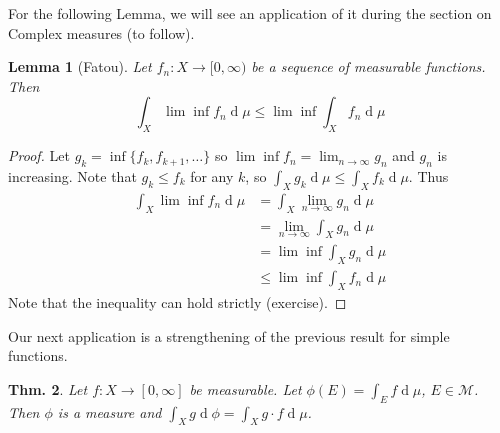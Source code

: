 \documentclass[12pt, a4paper]{book}
\renewcommand{\d}[1]{\ensuremath{\operatorname{d}\!{#1}}} %
\newtheorem{theorem}{Thm.}[section]
\newtheorem{lemma}[theorem]{Lemma}
\theoremstyle{nonumberplain}
\newtheorem{proof}{Proof}
\begin{document}
For the following Lemma, we will see an application of it during the section on Complex measures (to follow).
\begin{lemma}[Fatou]
    Let $f_n:X\to[0,\infty)$ be a sequence of measurable functions.
    Then
    \[\int_X\lim\inf f_n\d{\mu}\leq\lim\inf\int_X f_n\d{\mu}\]
\end{lemma}
\begin{proof}
    Let $g_k=\inf\{f_k,f_{k+1},\ldots\}$ so $\lim\inf f_n=\lim_{n\to\infty} g_n$ and $g_n$ is increasing.
    Note that $g_k\leq f_k$ for any $k$, so $\int_X g_k\d{\mu}\leq\int_X f_k\d{\mu}$.
    Thus
    \begin{align*}
        \int_X\lim\inf f_n\d{\mu} &= \int_X\lim_{n\to\infty}g_n\d{\mu}\\
                                  &= \lim_{n\to\infty}\int_X g_n\d{\mu}\\
                                  &= \lim\inf \int_X g_n\d{\mu}\\
                                  &\leq \lim\inf\int_X f_n\d{\mu}
    \end{align*}
    Note that the inequality can hold strictly (exercise).
\end{proof}
Our next application is a strengthening of the previous result for simple functions.
\begin{theorem}
    Let $f:X\to[0,\infty]$ be measurable.
    Let $\phi(E)=\int_E f\d{\mu}$, $E\in\mathcal{M}$.
    Then $\phi$ is a measure and $\int_X g\d{\phi}=\int_X g\cdot f\d{\mu}$.
\end{theorem}
\end{document}
